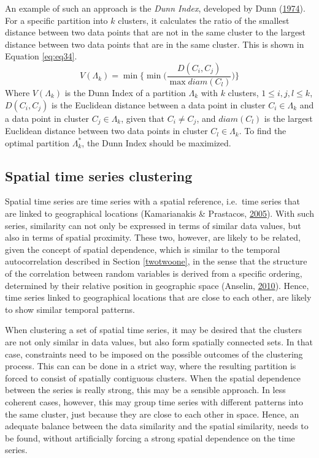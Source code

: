 \documentclass[12pt,oneside]{reedthesis}
\begin{document}
An example of such an approach is the \emph{Dunn Index}, developed by
Dunn (\protect\hyperlink{ref-dunn1974}{1974}). For a specific partition
into \(k\) clusters, it calculates the ratio of the smallest distance
between two data points that are not in the same cluster to the largest
distance between two data points that are in the same cluster. This is
shown in Equation \eqref{eq:eq34}.
\begin{equation}
V(\Lambda_{k}) = \min \Bigg\{ \min \Bigg(\frac{D(C_{i}, C_{j})}{\max diam(C_{l})} \Bigg) \Bigg\}
\label{eq:eq34}
\end{equation}
Where \(V(\Lambda_{k})\) is the Dunn Index of a partition
\(\Lambda_{k}\) with \(k\) clusters, \(1 \leq i, j, l \leq k\),
\(D(C_{i}, C_{j})\) is the Euclidean distance between a data point in
cluster \(C_{i} \in \Lambda_{k}\) and a data point in cluster
\(C_{j} \in \Lambda_{k}\), given that \(C_{i} \neq C_{j}\), and
\(diam(C_{l})\) is the largest Euclidean distance between two data
points in cluster \(C_{l} \in \Lambda_{k}\). To find the optimal
partition \(\Lambda_{k}^*\), the Dunn Index should be maximized.

\subsection{Spatial time series clustering}\label{twofivethree}

Spatial time series are time series with a spatial reference, i.e.~time
series that are linked to geographical locations (Kamarianakis \&
Prastacos, \protect\hyperlink{ref-kamarianakis2005}{2005}). With such
series, similarity can not only be expressed in terms of similar data
values, but also in terms of spatial proximity. These two, however, are
likely to be related, given the concept of spatial dependence, which is
similar to the temporal autocorrelation described in Section
\ref{twotwoone}, in the sense that the structure of the correlation
between random variables is derived from a specific ordering, determined
by their relative position in geographic space (Anselin,
\protect\hyperlink{ref-anselin2010}{2010}). Hence, time series linked to
geographical locations that are close to each other, are likely to show
similar temporal patterns.

When clustering a set of spatial time series, it may be desired that the
clusters are not only similar in data values, but also form spatially
connected sets. In that case, constraints need to be imposed on the
possible outcomes of the clustering process. This can can be done in a
strict way, where the resulting partition is forced to consist of
spatially contiguous clusters. When the spatial dependence between the
series is really strong, this may be a sensible approach. In less
coherent cases, however, this may group time series with different
patterns into the same cluster, just because they are close to each
other in space. Hence, an adequate balance between the data similarity
and the spatial similarity, needs to be found, without artificially
forcing a strong spatial dependence on the time series.
\end{document}
